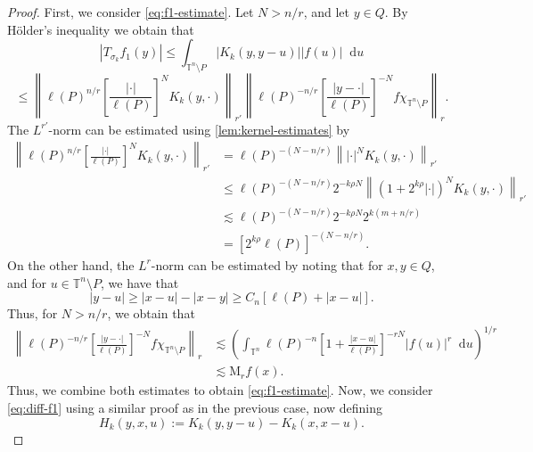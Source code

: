 \documentclass[12pt, reqno]{amsart}
\theoremstyle{definition}
\theoremstyle{remark}
\numberwithin{equation}{section}
\newcommand*\diff{\mathop{}\!\mathrm{d}}
\begin{document}
\begin{proof}
    First, we consider \cref{eq:f1-estimate}. Let $N>n/r$, and let $y\in Q$. By H\"older's inequality we obtain that
    \begin{equation*}
        |T_{\sigma_k}f_1(y)| \leq \int_{\mathbb{T}^n\setminus P} |K_k(y, y-u)||f(u)|\diff u 
    \end{equation*}
    \begin{equation*}
        \leq \left\| \ell(P)^{n/r} \left[ \frac{|\cdot|}{\ell(P)} \right]^N K_k(y, \cdot) 
        \right\|_{r'} \left\| \ell(P)^{-n/r} \left[ \frac{|y-\cdot|}{\ell(P)} \right]^{-N} f\chi_{\mathbb{T}^n\setminus P} 
        \right\|_r.
    \end{equation*}
    The $L^{r'}$-norm can be estimated using \cref{lem:kernel-estimates} by 
    \begin{align*}
        \left\| \ell(P)^{n/r} \left[ \frac{|\cdot|}{\ell(P)} \right]^N K_k(y, \cdot) 
        \right\|_{r'} & = \ell(P)^{-(N-n/r)} \left\| |\cdot|^N K_k(y, \cdot)  \right\|_{r'} \\
        & \leq \ell(P)^{-(N-n/r)} 2^{-k\rho N} \left\| (1+2^{k\rho} |\cdot|)^N K_k(y, \cdot)  \right\|_{r'} \\
        & \lesssim \ell(P)^{-(N-n/r)} 2^{-k\rho N} 2^{k(m+n/r)}\\
        & = [2^{k\rho}\ell(P)]^{-(N-n/r)}.
    \end{align*}
    On the other hand, the $L^r$-norm can be estimated by noting that for $x, y \in Q$, and for $u \in \mathbb{T}^n\setminus P$, we have that
    \begin{equation*}
        |y-u|\geq |x-u|-|x-y| \geq C_n[\ell(P)+|x-u|].
    \end{equation*}
    Thus, for $N>n/r$, we obtain that
    \begin{align*}
        \left\| \ell(P)^{-n/r} \left[ \frac{|y-\cdot|}{\ell(P)} \right]^{-N}f \chi_{\mathbb{T}^n\setminus P}
        \right\|_r& \lesssim\left( \int_{\mathbb{T}^n} \ell(P)^{-n} \left[ 1+\frac{|x-u|}{\ell(P)}
        \right]^{-rN} |f(u)|^r \diff u
        \right)^{1/r} \\
        & \lesssim\mathrm{M}_rf(x).
    \end{align*}
    Thus, we combine both estimates to obtain \cref{eq:f1-estimate}. Now, we consider \cref{eq:diff-f1} using a similar proof as in the previous case, now defining 
    \begin{equation*}
        H_k(y, x, u) := K_k(y, y-u) - K_k(x, x-u).
    \end{equation*}

\end{proof}
\end{document}
